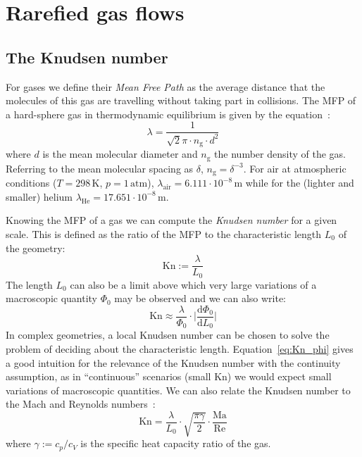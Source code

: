 \section{Rarefied gas flows}

\subsection{The Knudsen number}
For gases we define their \textit{Mean Free Path} as the average distance that 
the molecules of this gas are travelling without taking part in collisions.
The MFP of a hard-sphere gas in thermodynamic equilibrium is given by the equation~\cite{Zhang2012}:
\begin{equation}
 \lambda = \frac{1}{\sqrt{2} \pi \cdot n_\mathrm{g} \cdot d^2}
 \label{eq:MFP}
\end{equation}
where $d$ is the mean molecular diameter and $n_\mathrm{g}$ the number density of the gas.
Referring to the mean molecular spacing as $\delta$, $n_\mathrm{g}=\delta^{-3}$.
For air at atmospheric conditions ($T=298\,\mathrm{K}$, $p=1\,\mathrm{atm}$),
$\lambda_{\mathrm{air}} = 6.111\cdot10^{-8}\,\mathrm{m}$
while for the (lighter and smaller) helium 
$\lambda_{\mathrm{He}} = 17.651\cdot10^{-8}\,\mathrm{m}$.~\cite{Karniadakis_Microflows}

Knowing the MFP of a gas we can compute the \textit{Knudsen number} for a given scale.
This is defined as the ratio of the MFP to the characteristic length $L_0$ of the geometry:
\begin{equation}
 \mathrm{Kn} := \frac{\lambda}{L_0}
 \label{eq:Kn_def}
\end{equation}
The length $L_0$ can also be a limit above which very large variations of a macroscopic
quantity $\Phi_0$ may be observed and we can also write:
\begin{equation}
 \mathrm{Kn} \approx \frac{\lambda}{\Phi_0} \cdot \Big|\frac{\mathrm{d}\Phi_0}{\mathrm{d}L_0}\Big|
 \label{eq:Kn_phi}
\end{equation}
In complex geometries, a local Knudsen number can be chosen to solve the problem
of deciding about the characteristic length.
Equation~\ref{eq:Kn_phi} gives a good intuition for the relevance of the Knudsen number with
the continuity assumption, as in ``continuous'' scenarios (small $\mathrm{Kn}$) we would expect small
variations of macroscopic quantities. We can also relate the
Knudsen number to the Mach and Reynolds numbers~\cite{Zhang2012}:
\begin{equation}
 \mathrm{Kn} = \frac{\lambda}{L_0} \cdot \sqrt{\frac{\pi \gamma}{2}} \cdot \frac{\mathrm{Ma}}{\mathrm{Re}}
 \label{eq:Kn_Ma}
\end{equation}
where $\gamma := c_p / c_V$ is the specific heat capacity ratio of the gas.



